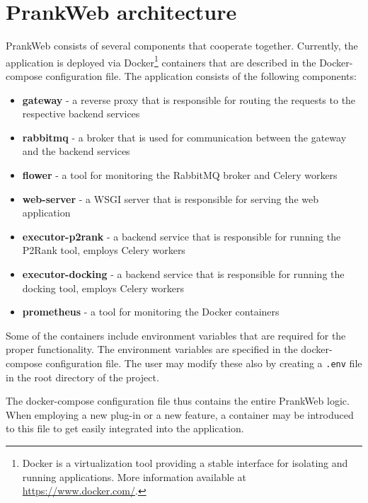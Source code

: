 \section{PrankWeb architecture}
\label{sec:prankweb_arch}

PrankWeb consists of several components that cooperate together. Currently, the application is deployed via Docker\footnote{Docker is a virtualization tool providing a stable interface for isolating and running applications. More information available at \url{https://www.docker.com/}.} containers that are described in the Docker-compose configuration file. The application consists of the following components:

\begin{itemize}
    \item \textbf{gateway} - a reverse proxy that is responsible for routing the requests to the respective backend services
    \item \textbf{rabbitmq} - a broker that is used for communication between the gateway and the backend services
    \item \textbf{flower} - a tool for monitoring the RabbitMQ broker and Celery workers
    \item \textbf{web-server} - a WSGI server that is responsible for serving the web application
    \item \textbf{executor-p2rank} - a backend service that is responsible for running the P2Rank tool, employs Celery workers
    \item \textbf{executor-docking} - a backend service that is responsible for running the docking tool, employs Celery workers 
    \item \textbf{prometheus} - a tool for monitoring the Docker containers 
\end{itemize}


Some of the containers include environment variables that are required for the proper functionality. The environment variables are specified in the docker-compose configuration file. The user may modify these also by creating a \texttt{.env} file in the root directory of the project.

The docker-compose configuration file thus contains the entire PrankWeb logic. When employing a new plug-in or a new feature, a container may be introduced to this file to get easily integrated into the application.

